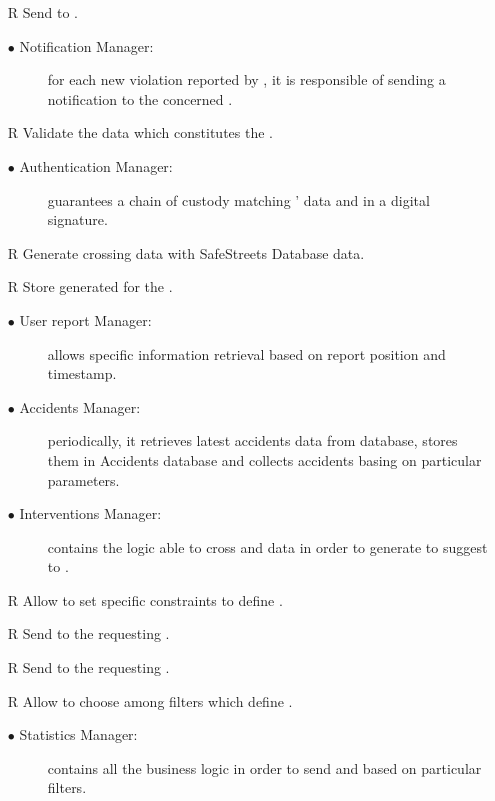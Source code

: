 \documentclass[../DD.tex]{subfiles}
\begin{document}
\begin{itemize}
	\item[R\subs{11}]Send  to .
	\begin{description}
	\item[$\bullet$ Notification Manager:] for each new violation reported by , it is responsible of sending a notification to the concerned . 
	\end{description}

	\item[R\subs{15}]Validate the data which constitutes the .
	\begin{description}
	\item[$\bullet$ Authentication Manager:] guarantees a chain of custody matching ' data and  in a digital signature.
	\end{description}

	\item[R\subs{16}]Generate  crossing   data with SafeStreets Database data.
	\item[R\subs{17}]Store generated  for the .
	\begin{description}
	\item[$\bullet$ User report Manager:] allows specific  information retrieval based on report position and timestamp.
	\item[$\bullet$ Accidents Manager:] periodically, it retrieves latest accidents data from  database, stores them in Accidents database and collects accidents basing on particular parameters.
	\item[$\bullet$ Interventions Manager:] contains the logic able to cross  and  data in order to generate  to suggest to .
	\end{description}
	
	\item[R\subs{18}]Allow  to set specific constraints to define .
	\item[R\subs{19}]Send  to the requesting .
	\item[R\subs{24}]Send  to the requesting .
	\item[R\subs{23}]Allow  to choose among filters which define .
	\begin{description}
	\item[$\bullet$ Statistics Manager:] contains all the business logic in order to send  and   based on particular filters.
	\end{description}
	

\end{itemize}
\end{document}
